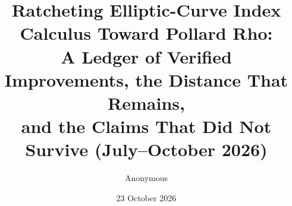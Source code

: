 \documentclass[10pt,a4paper]{article}
\title{Ratcheting Elliptic-Curve Index Calculus Toward Pollard Rho:\\[4pt]
       {\large A Ledger of Verified Improvements, the Distance That Remains,\\
       and the Claims That Did Not Survive (July--October 2026)}}
\author{Anonymous}
\date{23 October 2026}
\theoremstyle{definition}
\theoremstyle{remark}
\begin{document}
\maketitle

\begin{abstract}

\end{abstract}

\tableofcontents
\bigskip














\appendix




\end{document}
